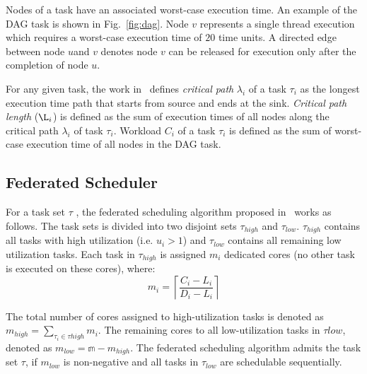 Nodes of a task have an associated worst-case execution time. 
An example of the DAG task is shown in Fig.~\ref{fig:dag}. Node $v$ represents a single thread execution which requires a worst-case execution time of $20$ time units. A directed edge between node $u$and $v$ denotes node $v$ can be released for execution only after the completion of node $u$.

For any given task, the work in~\cite{li2014analysis} defines \textit{critical path} $\lambda_i$ of a 
task $\tau_i$ as the longest execution time path that starts from
source and ends at the sink. \textit{Critical path length} ($\L_i$) is
defined as the sum of execution times of all nodes along the critical
path $\lambda_i$ of task $\tau_{i}$.  Workload $C_{i}$ of
a task $\tau_{i}$ is defined as the sum of worst-case execution time of
all nodes in the DAG task. 

\subsection{Federated Scheduler}
For a task set $\tau$ , the federated scheduling algorithm proposed in~\cite{li2014analysis} works as
follows. The task sets is divided into two disjoint sets
$\tau_{high}$  and $\tau_{low}$. $\tau_{high}$ contains all tasks with
high utilization (i.e. $u_i > 1$) and $\tau_{low}$ contains all
remaining low utilization tasks. Each task in $\tau_{high}$ is
assigned $m_{i}$ dedicated cores (no other task is executed on these
cores), where: \begin{equation}\label{eq:m} m_{i} = \left\lceil \frac{C_{i} - L_{i}}{D_{i} - L_{i}}
\right\rceil \end{equation}

\noindent The total
number of cores assigned to high-utilization tasks is denoted as $m_{high} = \sum_{\tau_{i} \in \tau{high}} m_{i}$. 
The remaining cores to all low-utilization tasks in $\tau{low}$, denoted
as ${m_{low} =  \mathbb{m} - m_{high}}$. The federated scheduling algorithm admits
the task set ${\tau}$, if $m_{low}$ is non-negative and all tasks in
$\tau_{low}$ are schedulable sequentially.  

